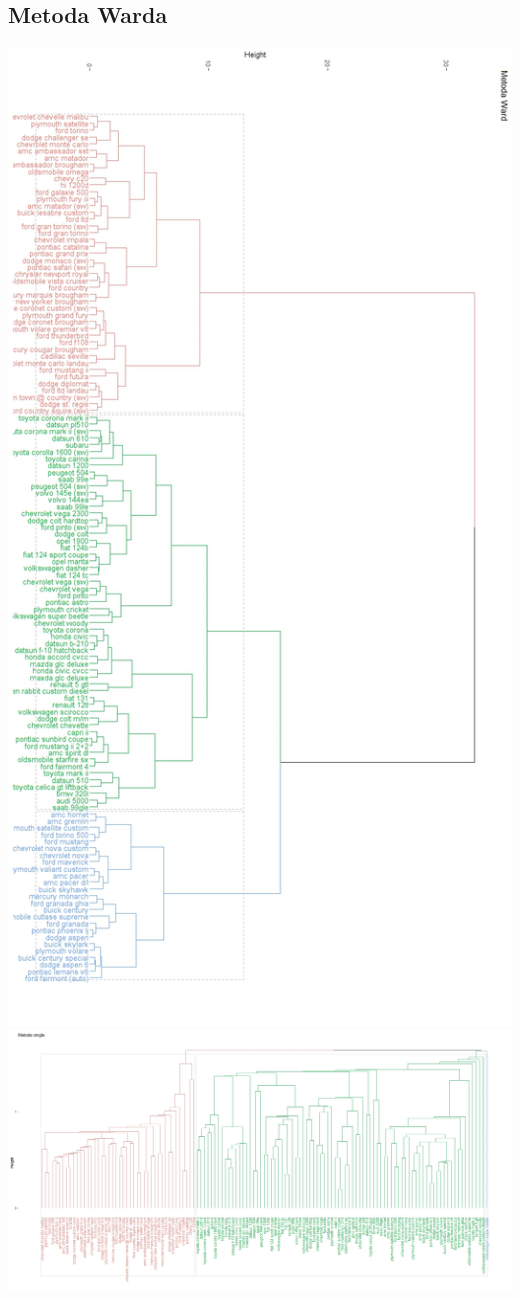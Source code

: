 \documentclass{article}
\begin{document}
    \subsection{Metoda Warda}
        \includegraphics[width = \textwidth]{ward_fig}
        \includegraphics[width = \textwidth]{single_fig.jpeg}
\end{document}
